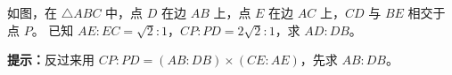 \documentclass{exam-zh}
\begin{document}

\begin{problem}[points=10]
  \noindent
  \begin{minipage}[t]{\dimexpr\linewidth-60mm-6mm\relax}
    \vspace{0pt}
    如图，在 $\triangle ABC$ 中，点 $D$ 在边 $AB$ 上，点 $E$ 在边 $AC$ 上，$CD$ 与 $BE$ 相交于点 $P$。
已知 $AE:EC=\sqrt{2}:1$，$CP:PD=2\sqrt{2}:1$，求 $AD:DB$。

    \begin{hintbox}
\textbf{提示：}反过来用 $CP:PD=(AB:DB)\times(CE:AE)$，先求 $AB:DB$。\end{hintbox}

  \end{minipage}\hfill
  \begin{diagramcoltikz}{60mm}{第 3 题图}
  }
  \end{diagramcoltikz}
  \par\medskip
  \answerarea[45mm]
\end{problem}
\end{document}
